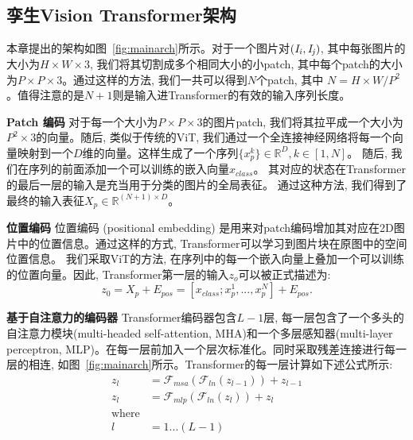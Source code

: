 \subsection{孪生Vision Transformer架构}
本章提出的架构如图~\ref{fig:mainarch}所示。对于一个图片对$(\it{I}_i, \it{I}_j)$, 其中每张图片的大小为$H \times W \times 3$, 我们将其切割成多个相同大小的小patch, 其中每个patch的大小为$P \times P \times 3$。通过这样的方法, 我们一共可以得到$N$个patch, 其中  $N = H \times W / P^2$。值得注意的是$N+1$则是输入进Transformer的有效的输入序列长度。 \par
\textbf{Patch 编码} \quad 对于每一个大小为$P \times P \times 3$的图片patch, 我们将其拉平成一个大小为$P^2 \times 3$的向量。随后, 类似于传统的ViT, 我们通过一个全连接神经网络将每一个向量映射到一个$D$维的向量。这样生成了一个序列$\{x_p^k\} \in \mathbb{R}^{D}, k \in [1, N]$。 随后, 我们在序列的前面添加一个可以训练的嵌入向量$x_{class}$。 其对应的状态在Transformer的最后一层的输入是充当用于分类的图片的全局表征。 通过这种方法, 我们得到了最终的输入表征$X_p \in \mathbb{R}^{(N+1) \times D}$。\par
\textbf{位置编码} \quad 位置编码 (positional embedding) 是用来对patch编码增加其对应在2D图片中的位置信息。通过这样的方式, Transformer可以学习到图片块在原图中的空间位置信息。 我们采取ViT的方法, 在序列中的每一个嵌入向量上叠加一个可以训练的位置向量。因此, Transformer第一层的输入$z_o $可以被正式描述为:
\begin{equation}
    z_0 = X_p + E_{pos} = [x_{class}; x_p^1 , ... , x_p^N ] + E_{pos}.
\end{equation} \par
\textbf{基于自注意力的编码器} \quad
Transformer编码器包含$L-1$层, 每一层包含了一个多头的自注意力模块(multi-headed self-attention, MHA)和一个多层感知器(multi-layer perceptron, MLP)。在每一层前加入一个层次标准化。同时采取残差连接进行每一层的相连, 如图~\ref{fig:mainarch}所示。Transformer的每一层计算如下述公式所示:
\begin{equation}
    \begin{split}
        z_{l} &= \mathcal{F}_{msa}(\mathcal{F}_{ln}(z_{l-1})) + z_{l-1}   \\
      z_{l} &= \mathcal{F}_{mlp}(\mathcal{F}_{ln}(z_{l} )) + z_{l} \\
      \text{where} \\ l & = 1 ... (L-1)
    \end{split}
  \end{equation} \par
